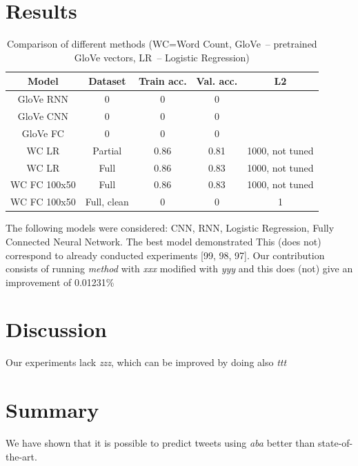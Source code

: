 \documentclass[10pt,conference,compsocconf]{IEEEtran}
\begin{document}
\section{Results}
\begin{table}[ht]
	\centering
	\tiny
	\begin{tabular}{|c | c |  c | c | c |} 
		\hline
		Model & Dataset & Train acc. & Val. acc. & L2 \\
		\hline
		GloVe RNN & 0 & 0 & 0 &   \\ 
		\hline
		GloVe CNN & 0 & 0 & 0 &  \\
		\hline
		GloVe FC & 0 & 0 & 0 & \\
		\hline
		WC LR & Partial & 0.86 & 0.81 & 1000, not tuned\\
		\hline
		WC LR & Full & 0.86 & 0.83 & 1000, not tuned\\
		\hline
		WC FC 100x50 & Full & 0.86 & 0.83 & 1000, not tuned\\
		\hline
		WC FC 100x50 & Full, clean & 0 & 0 & 1\\ [1ex] 
		\hline
	\end{tabular}
	\caption{Comparison of different methods (WC=Word Count, GloVe~-- pretrained GloVe vectors, LR~-- Logistic Regression)}
	\label{tab:results}
\end{table}

The following models were considered: CNN, RNN, Logistic Regression, Fully Connected Neural Network. The best model demonstrated This (does not) correspond to already conducted experiments [99, 98, 97]. Our contribution consists of running {\em method} with {\em xxx} modified with {\em yyy} and this does (not) give an improvement of 0.01231\%
\section{Discussion}
Our experiments lack {\em zzz}, which can be improved by doing also {\em ttt}
\section{Summary}
We have shown that it is possible to predict tweets using {\em aba} better than state-of-the-art.
\end{document}
